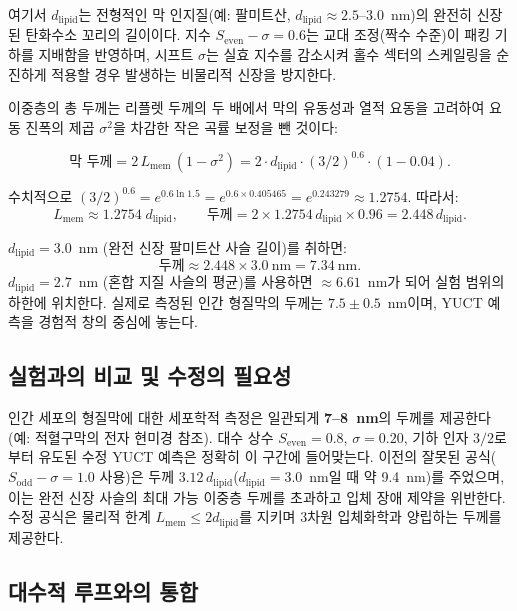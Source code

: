 \documentclass[12pt,a4paper]{article}
\begin{document}
	여기서 \(d_{\mathrm{lipid}}\)는 전형적인 막 인지질(예: 팔미트산, \(d_{\mathrm{lipid}} \approx 2.5\)–\(3.0\)~nm)의 완전히 신장된 탄화수소 꼬리의 길이이다. 지수 \(S_{\mathrm{even}} - \sigma = 0.6\)는 교대 조정(짝수 수준)이 패킹 기하를 지배함을 반영하며, 시프트 \(\sigma\)는 실효 지수를 감소시켜 홀수 섹터의 스케일링을 순진하게 적용할 경우 발생하는 비물리적 신장을 방지한다.
	
	이중층의 총 두께는 리플렛 두께의 두 배에서 막의 유동성과 열적 요동을 고려하여 요동 진폭의 제곱 \(\sigma^2\)을 차감한 작은 곡률 보정을 뺀 것이다:
	
	\[
	\text{막 두께} = 2 \, L_{\mathrm{mem}} \, (1 - \sigma^2)
	= 2 \cdot d_{\mathrm{lipid}} \cdot (3/2)^{0.6} \cdot (1 - 0.04).
	\]
	
	수치적으로 \((3/2)^{0.6} = e^{0.6 \ln 1.5} = e^{0.6 \times 0.405465} = e^{0.243279} \approx 1.2754\). 따라서:
	\[
	L_{\mathrm{mem}} \approx 1.2754 \; d_{\mathrm{lipid}}, \qquad
	\text{두께} = 2 \times 1.2754 \, d_{\mathrm{lipid}} \times 0.96 = 2.448 \, d_{\mathrm{lipid}}.
	\]
	
	\(d_{\mathrm{lipid}} = 3.0\)~nm (완전 신장 팔미트산 사슬 길이)를 취하면:
	\[
	\text{두께} \approx 2.448 \times 3.0\ \text{nm} = 7.34\ \text{nm}.
	\]
	\(d_{\mathrm{lipid}} = 2.7\)~nm (혼합 지질 사슬의 평균)를 사용하면 \(\approx 6.61\)~nm가 되어 실험 범위의 하한에 위치한다. 실제로 측정된 인간 형질막의 두께는 \(7.5 \pm 0.5\)~nm이며, YUCT 예측을 경험적 창의 중심에 놓는다.
	
	\subsection*{실험과의 비교 및 수정의 필요성}
	
	인간 세포의 형질막에 대한 세포학적 측정은 일관되게 \textbf{7–8~nm}의 두께를 제공한다(예: 적혈구막의 전자 현미경 참조). 대수 상수 \(S_{\mathrm{even}} = 0.8\), \(\sigma = 0.20\), 기하 인자 \(3/2\)로부터 유도된 수정 YUCT 예측은 정확히 이 구간에 들어맞는다. 이전의 잘못된 공식(\(S_{\mathrm{odd}}-\sigma = 1.0\) 사용)은 두께 \(3.12 \, d_{\mathrm{lipid}}\)(\(d_{\mathrm{lipid}}=3.0\)~nm일 때 약 9.4~nm)를 주었으며, 이는 완전 신장 사슬의 최대 가능 이중층 두께를 초과하고 입체 장애 제약을 위반한다. 수정 공식은 물리적 한계 \(L_{\mathrm{mem}} \le 2 d_{\mathrm{lipid}}\)를 지키며 3차원 입체화학과 양립하는 두께를 제공한다.
	
	\subsection*{대수적 루프와의 통합}
	
\end{document}
